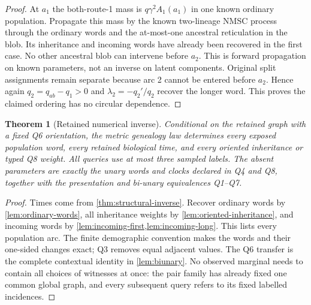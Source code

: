 \documentclass[11pt]{article}
\newtheorem{theorem}{Theorem}[section]
\begin{document}
\begin{proof}
At $a_1$ the both-route-1 mass is $q\gamma^2 A_1(a_1)$ in one known
ordinary population.  Propagate this mass by the known two-lineage NMSC
process through the ordinary words and the at-most-one ancestral
reticulation in the blob.  Its inheritance and incoming words have already
been recovered in the first case.  No other ancestral blob can intervene
before $a_2$.  This is forward propagation on known parameters, not an
inverse on latent components.  Original split assignments remain separate
because arc 2 cannot be entered before $a_2$.  Hence again
$q_2=q_{ab}-q_1>0$ and $\lambda_2=-q_2'/q_2$ recover the longer word.
This proves the claimed ordering has no circular dependence.
\end{proof}

\begin{theorem}[Retained numerical inverse]
\label{thm:numerical-inverse}
Conditional on the retained graph with a fixed Q6 orientation, the metric
genealogy law determines every exposed population word, every retained
biological time, and every oriented inheritance or typed Q8 weight.  All
queries use at most three sampled labels.  The absent parameters are
exactly the unary words and clocks declared in Q4 and Q8, together with
the presentation and bi-unary equivalences Q1--Q7.
\end{theorem}
\begin{proof}
Times come from \cref{thm:structural-inverse}.  Recover ordinary words by
\cref{lem:ordinary-words}, all inheritance weights by
\cref{lem:oriented-inheritance}, and incoming words by
\cref{lem:incoming-first,lem:incoming-long}.  This lists every population
arc.  The finite demographic convention makes the words and their
one-sided changes exact; Q3 removes equal adjacent values.  The Q6
transfer is the complete contextual identity in \cref{lem:biunary}.
No observed marginal needs to contain all choices of witnesses at once:
the pair family has already fixed one common global graph, and every
subsequent query refers to its fixed labelled incidences.
\end{proof}
\end{document}
